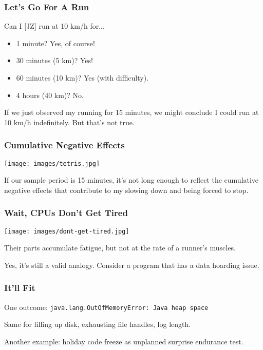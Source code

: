 \begin{frame}
\frametitle{Let's Go For A Run}

Can I [JZ] run at 10 km/h for...\\
\begin{itemize}
	\item 1 minute? Yes, of course!
	\item 30 minutes (5 km)? Yes!
	\item 60 minutes (10 km)? Yes (with difficulty).
	\item 4 hours (40 km)? No.
\end{itemize}

If we just observed my running for 15 minutes, we might conclude I could run at 10 km/h indefinitely. But that's not true.

\end{frame}

\begin{frame}
\frametitle{Cumulative Negative Effects}

\begin{center}
  \texttt{[image: images/tetris.jpg]}
\end{center}

If our sample period is 15 minutes, it's not long enough to reflect the cumulative negative effects that contribute to my slowing down and being forced to stop. 

\end{frame}

\begin{frame}
\frametitle{Wait, CPUs Don't Get Tired}

\begin{center}
  \texttt{[image: images/dont-get-tired.jpg]}
\end{center}

Their parts accumulate fatigue, but not at the rate of a runner's muscles.

Yes, it's still a valid analogy. Consider a program that has a data hoarding issue.

\end{frame}

\begin{frame}
\frametitle{It'll Fit}

One outcome: \texttt{java.lang.OutOfMemoryError: Java heap space}

Same for filling up disk, exhausting file handles, log length.

Another example: holiday code freeze as unplanned surprise endurance test.

\end{frame}

